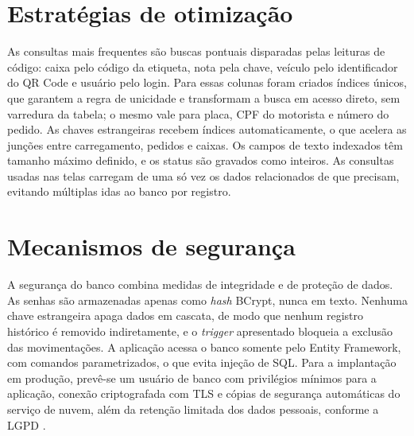 \section{Estratégias de otimização}

As consultas mais frequentes são buscas pontuais disparadas pelas leituras de código: caixa pelo código da etiqueta, nota pela chave, veículo pelo identificador do QR Code e usuário pelo login. Para essas colunas foram criados índices únicos, que garantem a regra de unicidade e transformam a busca em acesso direto, sem varredura da tabela; o mesmo vale para placa, CPF do motorista e número do pedido. As chaves estrangeiras recebem índices automaticamente, o que acelera as junções entre carregamento, pedidos e caixas. Os campos de texto indexados têm tamanho máximo definido, e os status são gravados como inteiros. As consultas usadas nas telas carregam de uma só vez os dados relacionados de que precisam, evitando múltiplas idas ao banco por registro.

\section{Mecanismos de segurança}

A segurança do banco combina medidas de integridade e de proteção de dados. As senhas são armazenadas apenas como \textit{hash} BCrypt, nunca em texto. Nenhuma chave estrangeira apaga dados em cascata, de modo que nenhum registro histórico é removido indiretamente, e o \textit{trigger} apresentado bloqueia a exclusão das movimentações. A aplicação acessa o banco somente pelo Entity Framework, com comandos parametrizados, o que evita injeção de SQL. Para a implantação em produção, prevê-se um usuário de banco com privilégios mínimos para a aplicação, conexão criptografada com TLS e cópias de segurança automáticas do serviço de nuvem, além da retenção limitada dos dados pessoais, conforme a LGPD \cite{brasil2018lgpd}.
